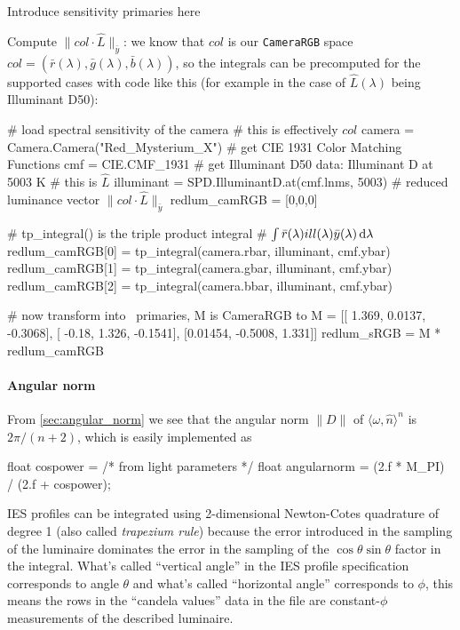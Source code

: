 Introduce sensitivity primaries here

Compute $\|col\cdot \hat L\|_{\bar y}$: we know that $col$ is
our \texttt{CameraRGB} space $col = (\bar r(\lambda), \bar g(\lambda), \bar b(\lambda))$,
so the integrals can be precomputed for the supported cases with
code like this (for example in the case of $\hat L(\lambda)$ being Illuminant D50):

\begin{pythoncode}
# load spectral sensitivity of the camera
# this is effectively $col$
camera = Camera.Camera("Red_Mysterium_X")
# get CIE 1931 Color Matching Functions
cmf = CIE.CMF_1931
# get Illuminant D50 data: Illuminant D at 5003 K
# this is $\hat{L}$
illuminant = SPD.IlluminantD.at(cmf.lnms, 5003)
# reduced luminance vector $\|col\cdot \hat{L}\|_{\bar{y}}$
redlum_camRGB = [0,0,0]

# tp\_integral() is the triple product integral
# $\int \bar{r}(\lambda) ill(\lambda) \bar{y}(\lambda) \mathop{}\!\mathrm{d}\lambda$
redlum_camRGB[0] = tp_integral(camera.rbar, illuminant, cmf.ybar)
redlum_camRGB[1] = tp_integral(camera.gbar, illuminant, cmf.ybar)
redlum_camRGB[2] = tp_integral(camera.bbar, illuminant, cmf.ybar)

# now transform into \sRGBl\ primaries, M is CameraRGB to \sRGBl
M = [[  1.369,  0.0137, -0.3068],
 [  -0.18,   1.326, -0.1541],
 [0.01454, -0.5008,   1.331]]
redlum_sRGB = M * redlum_camRGB

\end{pythoncode}


\paragraph{Angular norm}

From \cref{sec:angular_norm} we see that the angular norm $\|D\|$ of
$\langle \omega, \hat n \rangle^n$ is $2\pi / (n+2)$, which is easily
implemented as

\begin{c++code}
float cospower = /* from light parameters */
float angularnorm = (2.f * M_PI) / (2.f + cospower);
\end{c++code}

\Gls{IES} profiles can be integrated using 2-dimensional Newton-Cotes quadrature
of degree 1 (also called \textsl{trapezium rule}) because the error introduced
in the sampling of the luminaire dominates the error in the sampling of the
$\cos\theta\sin\theta$ factor in the integral. What's called ``vertical angle''
in the \gls{IES} profile specification corresponds to angle $\theta$ and what's
called ``horizontal angle'' corresponds to $\phi$, this means the rows in the
``candela values'' data in the file are constant-$\phi$ measurements of the
described luminaire.

